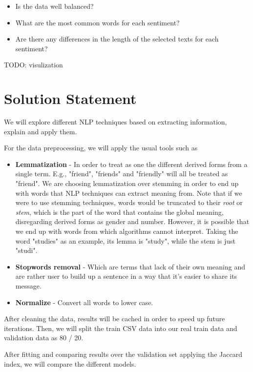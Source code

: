 \documentclass[11pt]{article}
\begin{document}
\begin{itemize}
    \item Is the data well balanced?
    \item What are the most common words for each sentiment?
    \item Are there any differences in the length of the selected texts for each sentiment?
\end{itemize}

TODO: visulization

\section{Solution Statement}

We will explore different NLP techniques based on extracting information, explain and apply them.

For the data preprocessing, we will apply the usual tools such as 

\begin{itemize}
    \item \textbf{Lemmatization} - In order to treat as one the different derived forms from a single term. E.g., "friend", "friends" and "friendly" will all be treated as "friend". We are choosing lemmatization over stemming in order to end up with words that NLP techniques can extract meaning from. Note that if we were to use stemming techniques, words would be truncated to their \textit{root} or \textit{stem}, which is the part of the word that contains the global meaning, disregarding derived forms as gender and number. However, it is possible that we end up with words from which algorithms cannot interpret. Taking the word "studies" as an example, its lemma is "study", while the stem is just "studi".
    \item \textbf{Stopwords removal} - Which are terms that lack of their own meaning and are rather user to build up a sentence in a way that it's easier to share its message.
    \item \textbf{Normalize} - Convert all words to lower case.
\end{itemize}

After cleaning the data, results will be cached in order to speed up future iterations. Then, we will split the train CSV data into our real train data and validation data as 80 / 20.

After fitting and comparing results over the validation set applying the Jaccard index, we will compare the different models.
\end{document}
